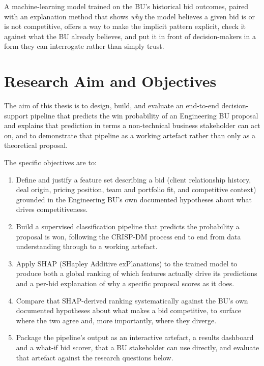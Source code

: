 A machine-learning model trained on the BU's historical bid outcomes,
paired with an explanation method that shows \emph{why} the model
believes a given bid is or is not competitive, offers a way to make the
implicit pattern explicit, check it against what the BU already
believes, and put it in front of decision-makers in a form they can
interrogate rather than simply trust.

\hypertarget{research-aim-and-objectives}{%
\section{Research Aim and
Objectives}\label{research-aim-and-objectives}}

The aim of this thesis is to design, build, and evaluate an end-to-end
decision-support pipeline that predicts the win probability of an
Engineering BU proposal and explains that prediction in terms a
non-technical business stakeholder can act on, and to demonstrate that
pipeline as a working artefact rather than only as a theoretical
proposal.

The specific objectives are to:

\begin{enumerate}
\def\labelenumi{\arabic{enumi}.}
\tightlist
\item
  Define and justify a feature set describing a bid (client relationship
  history, deal origin, pricing position, team and portfolio fit, and
  competitive context) grounded in the Engineering BU's own documented
  hypotheses about what drives competitiveness.
\item
  Build a supervised classification pipeline that predicts the
  probability a proposal is won, following the CRISP-DM process
  \citep{chapman2000crispdm} end to end from data understanding through
  to a working artefact.
\item
  Apply SHAP (SHapley Additive exPlanations) \citep{lundberg2017unified}
  to the trained model to produce both a global ranking of which
  features actually drive its predictions and a per-bid explanation of
  why a specific proposal scores as it does.
\item
  Compare that SHAP-derived ranking systematically against the BU's own
  documented hypotheses about what makes a bid competitive, to surface
  where the two agree and, more importantly, where they diverge.
\item
  Package the pipeline's output as an interactive artefact, a results
  dashboard and a what-if bid scorer, that a BU stakeholder can use
  directly, and evaluate that artefact against the research questions
  below.
\end{enumerate}

